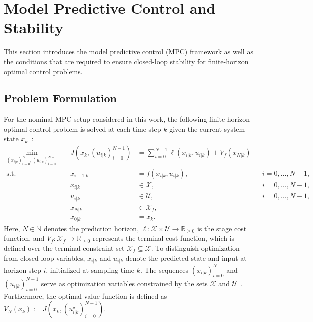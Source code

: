 \section{Model Predictive Control and Stability}
\label{sec:mpc-stability}
This section introduces the model predictive control (MPC) framework as well as
the conditions that are required to ensure closed-loop stability for 
finite-horizon optimal control problems.


\subsection{Problem Formulation}
\label{subsec:mpc-problem}

For the nominal MPC setup considered in this work, the following finite-horizon optimal control problem  
is solved at each time step $k$ given the current system state $x_k$~:
\begin{equation}
    \label{eq:mpc-problem}
    \begin{aligned}
        \min_{(x_{i|k})_{i=0}^N, (u_{i|k})_{i=0}^{N-1}} \; 
                        & & J \left(x_k, (u_{i|k})_{i=0}^{N-1} \right) &= \sum_{i=0}^{N-1} \ell(x_{i|k}, u_{i|k}) + V_f(x_{N|k}) \\
        \text{s.t.} \;  & & x_{i+1|k}   &= f(x_{i|k}, u_{i|k}),     && i = 0, \dots, N-1, \\
                        & & x_{i|k}     &\in \mathcal{X},           && i = 0, \dots, N-1, \\
                        & & u_{i|k}     &\in \mathcal{U},           && i = 0, \dots, N-1, \\
                        & & x_{N|k}     &\in \mathcal{X}_f, \\
                        & & x_{0|k}     &= x_k.
    \end{aligned}
\end{equation}
Here, $N \in \mathbb{N}$ denotes the prediction horizon, $\ell: \mathcal{X} \times \mathcal{U} \to \mathbb{R}_{\ge 0}$ is the stage cost function, 
and $V_f: \mathcal{X}_f \to \mathbb{R}_{\ge 0}$ represents the terminal cost function, which is defined over the terminal constraint set 
$\mathcal{X}_f \subseteq \mathcal{X}$. To distinguish optimization from closed-loop variables, 
$x_{i|k}$ and $u_{i|k}$ denote the predicted state and input at horizon step $i$, initialized at sampling time $k$. 
The sequences $(x_{i|k})_{i=0}^N$ and $(u_{i|k})_{i=0}^{N-1}$ serve as optimization variables constrained by the 
sets $\mathcal{X}$ and $\mathcal{U}$~. Furthermore, the optimal value function is defined as 
$V_N(x_k) := J \left( x_k, (u_{i\vert{}k}^\star)_{i=0}^{N-1} \right)$.

